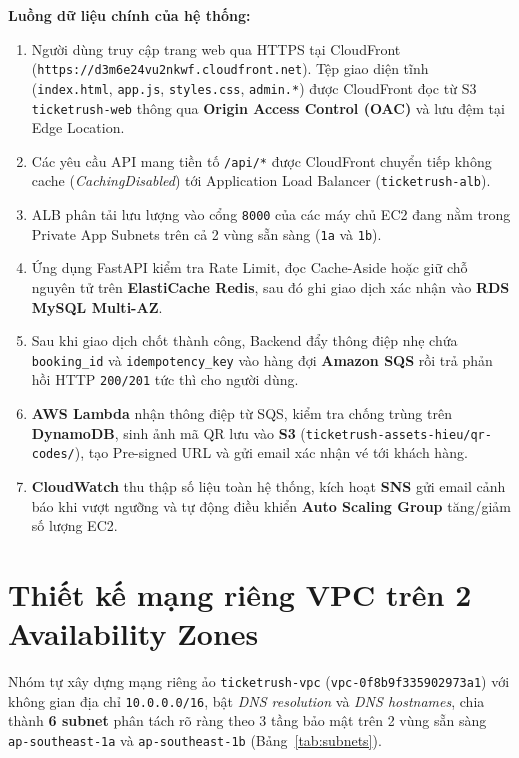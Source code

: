 \noindent\textbf{Luồng dữ liệu chính của hệ thống:}
\begin{enumerate}[leftmargin=1.5em]
  \item Người dùng truy cập trang web qua HTTPS tại CloudFront (\texttt{https://d3m6e24vu2nkwf.cloudfront.net}). Tệp giao diện tĩnh (\texttt{index.html}, \texttt{app.js}, \texttt{styles.css}, \texttt{admin.*}) được CloudFront đọc từ S3 \texttt{ticketrush-web} thông qua \textbf{Origin Access Control (OAC)} và lưu đệm tại Edge Location.
  \item Các yêu cầu API mang tiền tố \texttt{/api/*} được CloudFront chuyển tiếp không cache (\textit{CachingDisabled}) tới Application Load Balancer (\texttt{ticketrush-alb}).
  \item ALB phân tải lưu lượng vào cổng \texttt{8000} của các máy chủ EC2 đang nằm trong Private App Subnets trên cả 2 vùng sẵn sàng (\texttt{1a} và \texttt{1b}).
  \item Ứng dụng FastAPI kiểm tra Rate Limit, đọc Cache-Aside hoặc giữ chỗ nguyên tử trên \textbf{ElastiCache Redis}, sau đó ghi giao dịch xác nhận vào \textbf{RDS MySQL Multi-AZ}.
  \item Sau khi giao dịch chốt thành công, Backend đẩy thông điệp nhẹ chứa \texttt{booking\_id} và \texttt{idempotency\_key} vào hàng đợi \textbf{Amazon SQS} rồi trả phản hồi HTTP \texttt{200/201} tức thì cho người dùng.
  \item \textbf{AWS Lambda} nhận thông điệp từ SQS, kiểm tra chống trùng trên \textbf{DynamoDB}, sinh ảnh mã QR lưu vào \textbf{S3} (\texttt{ticketrush-assets-hieu/qr-codes/}), tạo Pre-signed URL và gửi email xác nhận vé tới khách hàng.
  \item \textbf{CloudWatch} thu thập số liệu toàn hệ thống, kích hoạt \textbf{SNS} gửi email cảnh báo khi vượt ngưỡng và tự động điều khiển \textbf{Auto Scaling Group} tăng/giảm số lượng EC2.
\end{enumerate}

\section{Thiết kế mạng riêng VPC trên 2 Availability Zones}
Nhóm tự xây dựng mạng riêng ảo \texttt{ticketrush-vpc} (\texttt{vpc-0f8b9f335902973a1}) với không gian địa chỉ \texttt{10.0.0.0/16}, bật \textit{DNS resolution} và \textit{DNS hostnames}, chia thành \textbf{6 subnet} phân tách rõ ràng theo 3 tầng bảo mật trên 2 vùng sẵn sàng \texttt{ap-southeast-1a} và \texttt{ap-southeast-1b} (Bảng~\ref{tab:subnets}).

